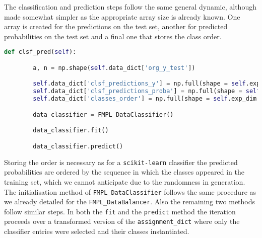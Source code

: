 The classification and prediction steps follow the same general dynamic, although made somewhat simpler as the appropriate array size is already known.
One array is created for the predictions on the test set, another for predicted probabilities on the test set and a final one that stores the class order.
 
\begin{lstlisting}[language=Python, numbers=none]
    def clsf_pred(self):

        a, n = np.shape(self.data_dict['org_y_test'])

        self.data_dict['clsf_predictions_y'] = np.full(shape = self.exp_dim + (n,), fill_value = np.nan)
        self.data_dict['clsf_predictions_proba'] = np.full(shape = self.exp_dim + (n, 2), fill_value = np.nan)
        self.data_dict['classes_order'] = np.full(shape = self.exp_dim + (2,), fill_value = np.nan)

        data_classifier = FMPL_DataClassifier()

        data_classifier.fit()

        data_classifier.predict()

\end{lstlisting}

Storing the order is necessary as for a \texttt{scikit-learn} classifier the predicted probabilities are ordered by the sequence in which the classes appeared in the training set,
which we cannot anticipate due to the randomness in generation. 
The initialisation method of \texttt{FMPL\_DataClassifier} follows the same procedure as we already detailed for the \texttt{FMPL\_DataBalancer}.
Also the remaining two methods follow similar steps. 
In both the \texttt{fit} and the \texttt{predict} method the iteration proceeds over a transformed version of the \texttt{assignment\_dict} 
where only the classifier entries were selected and their classes instantiated.

